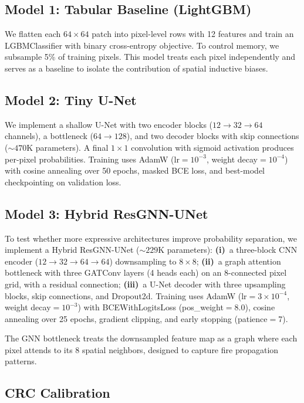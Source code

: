 \documentclass{article}
\begin{document}
\subsection{Model 1: Tabular Baseline (LightGBM)}

We flatten each $64{\times}64$ patch into pixel-level rows with 12 features and train an LGBMClassifier \citep{ke2017lightgbm} with binary cross-entropy objective.
To control memory, we subsample 5\% of training pixels.
This model treats each pixel independently and serves as a baseline to isolate the contribution of spatial inductive biases.

\subsection{Model 2: Tiny U-Net}

We implement a shallow U-Net \citep{ronneberger2015unet} with two encoder blocks ($12{\to}32{\to}64$ channels), a bottleneck ($64{\to}128$), and two decoder blocks with skip connections (${\sim}470$K parameters).
A final $1{\times}1$ convolution with sigmoid activation produces per-pixel probabilities.
Training uses AdamW (lr$=10^{-3}$, weight decay$=10^{-4}$) with cosine annealing over 50 epochs, masked BCE loss, and best-model checkpointing on validation loss.

\subsection{Model 3: Hybrid ResGNN-UNet}
\label{sec:resgnn}

To test whether more expressive architectures improve probability separation, we implement a Hybrid ResGNN-UNet (${\sim}229$K parameters):
\textbf{(i)}~a three-block CNN encoder ($12{\to}32{\to}64{\to}64$) downsampling to $8{\times}8$;
\textbf{(ii)}~a graph attention bottleneck with three GATConv layers \citep{veličković2018graph} (4 heads each) on an 8-connected pixel grid, with a residual connection;
\textbf{(iii)}~a U-Net decoder with three upsampling blocks, skip connections, and Dropout2d.
Training uses AdamW (lr$=3{\times}10^{-4}$, weight decay$=10^{-3}$) with BCEWithLogitsLoss (pos\_weight$=8.0$), cosine annealing over 25 epochs, gradient clipping, and early stopping (patience$=$7).

The GNN bottleneck treats the downsampled feature map as a graph where each pixel attends to its 8 spatial neighbors, designed to capture fire propagation patterns.

\subsection{CRC Calibration}
\label{sec:crc-method}
\end{document}
